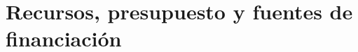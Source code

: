 \chapter{Recursos, presupuesto y fuentes de financiación}
\ifpdf
    \graphicspath{{Chapter4/Chapter4Figs/PNG/}{Chapter4/Chapter4Figs/PDF/}{Chapter4/ChapterFigs/}}
\else
    \graphicspath{{Chapter4/Chapter4Figs/EPS/}{Chapter4/Chapter4Figs/}}
\fi



